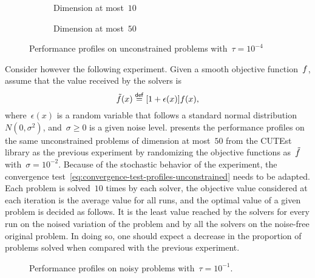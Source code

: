 \begin{figure}[ht]
    \begin{subfigure}[b]{0.49\textwidth}
        \centering
        \caption{Dimension at most~$10$}
        \label{fig:ppu-10}
    \end{subfigure}
    \hfill
    \begin{subfigure}[b]{0.49\textwidth}
        \centering
        \caption{Dimension at most~$50$}
        \label{fig:ppu-50}
    \end{subfigure}
    \caption{Performance profiles on unconstrained problems with~$\tau = 10^{-4}$}
\end{figure}

Consider however the following experiment.
Given a smooth objective function~$f$, assume that the value received by the solvers is
\begin{equation*}
    \tilde{\obj}(\iter) \eqdef [1 + \epsilon(\iter)] \obj(\iter),
\end{equation*}
where~$\epsilon(x)$ is a random variable that follows a standard normal distribution~$N(0, \sigma^2)$, and~$\sigma \ge 0$ is a given noise level.
 presents the performance profiles on the same unconstrained problems of dimension at most~$50$ from the CUTEst library as the previous experiment by randomizing the objective functions as~$\tilde{f}$ with~$\sigma = 10^{-2}$.
Because of the stochastic behavior of the experiment, the convergence test~\cref{eq:convergence-test-profiles-unconstrained} needs to be adapted.
Each problem is solved~$10$ times by each solver, the objective value considered at each iteration is the average value for all runs, and the optimal value of a given problem is decided as follows.
It is the least value reached by the solvers for every run on the noised variation of the problem and by all the solvers on the noise-free original problem.
In doing so, one should expect a decrease in the proportion of problems solved when compared with the previous experiment.

\begin{figure}[ht]
    \centering
    \caption{Performance profiles on noisy problems with~$\tau = 10^{-1}$.}
    \label{fig:ppun-50}
\end{figure}

